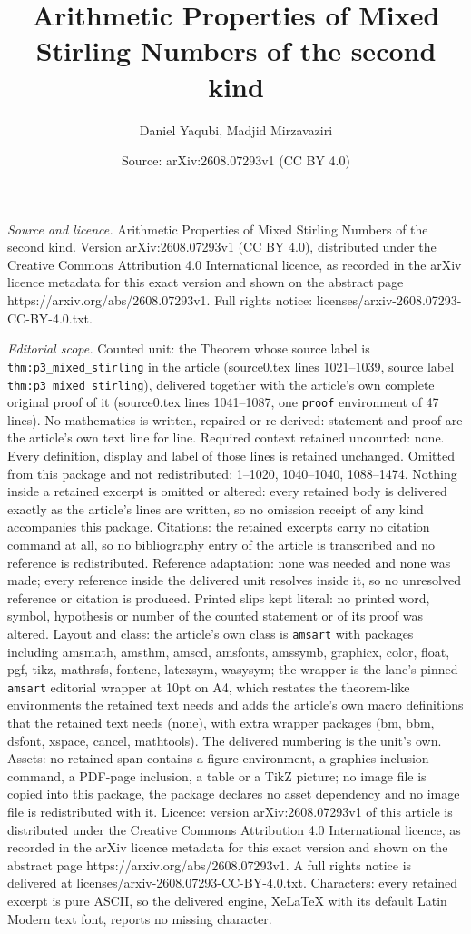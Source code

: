 \documentclass[10pt,a4paper]{amsart}
\title[Arithmetic Properties of Mixed Stirling Numbers of the secon]{Arithmetic Properties of Mixed Stirling Numbers of the second kind}
\author{Daniel Yaqubi, Madjid Mirzavaziri}
\date{Source: arXiv:2608.07293v1 (CC BY 4.0)}
\begin{document}
\maketitle

\noindent\emph{Source and licence.} Arithmetic Properties of Mixed Stirling Numbers of the second kind. Version arXiv:2608.07293v1 (CC BY 4.0), distributed under the Creative Commons Attribution 4.0 International licence, as recorded in the arXiv licence metadata for this exact version and shown on the abstract page https://arxiv.org/abs/2608.07293v1. Full rights notice: licenses/arxiv-2608.07293-CC-BY-4.0.txt.\par\smallskip

\noindent\textit{Editorial scope.} Counted unit: the Theorem whose source label is \texttt{thm:p3\_mixed\_stirling} in the article (source0.tex lines 1021--1039, source label \texttt{thm:p3\_mixed\_stirling}), delivered together with the article's own complete original proof of it (source0.tex lines 1041--1087, one \texttt{proof} environment of 47 lines). No mathematics is written, repaired or re-derived: statement and proof are the article's own text line for line. Required context retained uncounted: none. Every definition, display and label of those lines is retained unchanged. Omitted from this package and not redistributed: 1--1020, 1040--1040, 1088--1474. Nothing inside a retained excerpt is omitted or altered: every retained body is delivered exactly as the article's lines are written, so no omission receipt of any kind accompanies this package. Citations: the retained excerpts carry no citation command at all, so no bibliography entry of the article is transcribed and no reference is redistributed. Reference adaptation: none was needed and none was made; every reference inside the delivered unit resolves inside it, so no unresolved reference or citation is produced. Printed slips kept literal: no printed word, symbol, hypothesis or number of the counted statement or of its proof was altered. Layout and class: the article's own class is \texttt{amsart} with packages including amsmath, amsthm, amscd, amsfonts, amssymb, graphicx, color, float, pgf, tikz, mathrsfs, fontenc, latexsym, wasysym; the wrapper is the lane's pinned \texttt{amsart} editorial wrapper at 10pt on A4, which restates the theorem-like environments the retained text needs and adds the article's own macro definitions that the retained text needs (none), with extra wrapper packages (bm, bbm, dsfont, xspace, cancel, mathtools). The delivered numbering is the unit's own. Assets: no retained span contains a figure environment, a graphics-inclusion command, a PDF-page inclusion, a table or a TikZ picture; no image file is copied into this package, the package declares no asset dependency and no image file is redistributed with it. Licence: version arXiv:2608.07293v1 of this article is distributed under the Creative Commons Attribution 4.0 International licence, as recorded in the arXiv licence metadata for this exact version and shown on the abstract page https://arxiv.org/abs/2608.07293v1. A full rights notice is delivered at licenses/arxiv-2608.07293-CC-BY-4.0.txt. Characters: every retained excerpt is pure ASCII, so the delivered engine, XeLaTeX with its default Latin Modern text font, reports no missing character.
\end{document}
